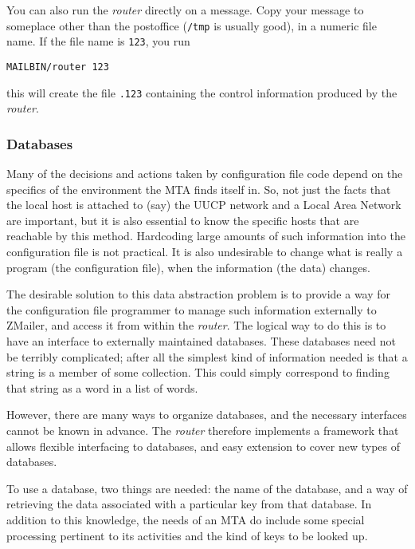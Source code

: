 You can also run the {\em router\/} directly on a message.  Copy your message
to someplace other than the postoffice ({\tt /tmp} is usually good), in a
numeric file name.  If the file name is {\tt 123}, you run

\begin{verbatim}
MAILBIN/router 123
\end{verbatim}


this will create the file {\tt .123} containing the control information
produced by the {\em router\/}.






\subsubsection{Databases\label{Databases}}



Many of the decisions and actions taken by configuration file code depend
on the specifics of the environment the MTA finds itself in.  So, not just
the facts that the local host is attached to (say) the UUCP network and a
Local Area Network are important, but it is also essential to know the specific
hosts that are reachable by this method.  Hardcoding large amounts of such
information into the configuration file is not practical.  It is also
undesirable to change what is really a program (the configuration file),
when the information (the data) changes.

The desirable solution to this data abstraction problem is to provide a way
for the configuration file programmer to manage such information externally
to ZMailer, and access it from within the {\em router\/}.  The logical way to do
this is to have an interface to externally maintained databases.  These
databases need not be terribly complicated; after all the simplest kind of
information needed is that a string is a member of some collection.  This
could simply correspond to finding that string as a word in a list of
words.

However, there are many ways to organize databases, and the necessary
interfaces cannot be known in advance.  The {\em router\/} therefore implements a
framework that allows flexible interfacing to databases, and easy extension
to cover new types of databases.

To use a database, two things are needed: the name of the database, and a
way of retrieving the data associated with a particular key from that
database.  In addition to this knowledge, the needs of an MTA do include
some special processing pertinent to its activities and the kind of keys to
be looked up.

